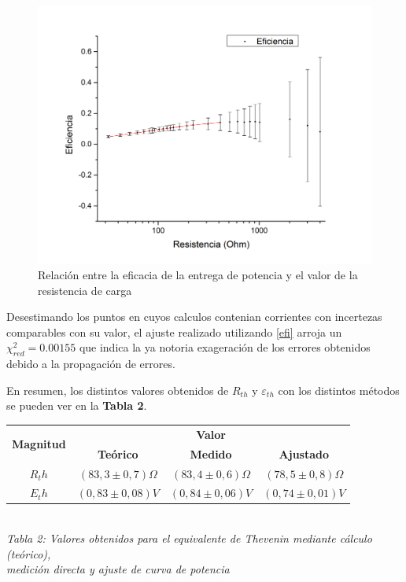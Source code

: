 \documentclass[11pt,a4paper]{article}
\begin{document}
\begin{figure}[h]
  \centering
  \includegraphics[scale=0.4]{Eficiencia_vs_Resistencia}
  \caption{Relación entre la eficacia de la entrega de potencia y el valor de la resistencia de carga}
  \label{fig:efi_res}
\end{figure}

Desestimando los puntos en cuyos calculos contenian corrientes con incertezas comparables con su valor, el ajuste realizado utilizando \eqref{efi} arroja un $\chi_{red}^{2} = 0.00155$ que indica la ya notoria exageración de los errores obtenidos debido a la propagación de errores.  

En resumen, los distintos valores obtenidos de $R_{th}$ y $\varepsilon_{th}$ con los distintos métodos se pueden ver en la \textbf{Tabla 2}.

\begin{center}
\begin{tabular}{||c|c|c|c||}
\hline
\multirow{2}{*}{\textbf{Magnitud}} & \multicolumn{3}{c||}{\textbf{Valor}} \\ \cline{2-4}
  & \textbf{Teórico} & \textbf{Medido} & \textbf{Ajustado} \\ \hline
$R_th$ & $(83,3\pm0,7)\Omega$ & $(83,4\pm0,6)\Omega$ & $(78,5\pm0,8)\Omega$ \\ \hline
$E_th$ & $(0,83\pm0,08)V$ & $(0,84\pm0,06)V$ & $(0,74\pm0,01)V$ \\ \hline
\end{tabular}\\[0.5cm]
\textit{Tabla 2: Valores obtenidos para el equivalente de Thevenin mediante cálculo (teórico),\\ medición directa y ajuste de curva de potencia}
\end{center}
\end{document}
